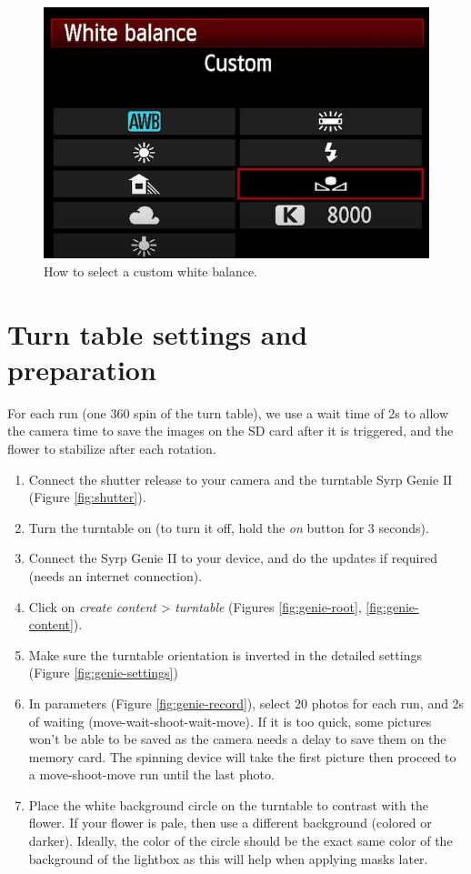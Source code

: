 \documentclass[
]{book}
\begin{document}
\begin{figure}

{\centering \includegraphics[width=0.5\linewidth]{Figures/Custom WB selection} 

}

\caption{How to select a custom white balance.}\label{fig:WB2}
\end{figure}

\hypertarget{turn-table-settings-and-preparation}{%
\section{Turn table settings and preparation}\label{turn-table-settings-and-preparation}}

For each run (one 360 spin of the turn table), we use a wait time of 2s
to allow the camera time to save the images on the SD card after it is
triggered, and the flower to stabilize after each rotation.

\begin{enumerate}
\def\labelenumi{\arabic{enumi}.}
\item
  Connect the shutter release to your camera and the turntable Syrp
  Genie II (Figure \ref{fig:shutter}).
\item
  Turn the turntable on (to turn it off, hold the \emph{on} button for 3
  seconds).
\item
  Connect the Syrp Genie II to your device, and do the updates if
  required (needs an internet connection).
\item
  Click on \emph{create content} \textgreater{} \emph{turntable} (Figures
  \ref{fig:genie-root}, \ref{fig:genie-content}).
\item
  Make sure the turntable orientation is inverted in the detailed settings
  (Figure \ref{fig:genie-settings})
\item
  In parameters (Figure \ref{fig:genie-record}), select 20 photos for
  each run, and 2s of
  waiting (move-wait-shoot-wait-move). If it is too quick, some
  pictures won't be able to be saved as the camera needs a delay to
  save them on the memory card. The spinning device will take the
  first picture then proceed to a move-shoot-move run until the last
  photo.
\item
  Place the white background circle on the turntable to contrast with
  the flower. If your flower is pale, then use a different background
  (colored or darker). Ideally, the color of the circle should be the
  exact same color of the background of the lightbox as this will help
  when applying masks later.
\end{enumerate}
\end{document}
